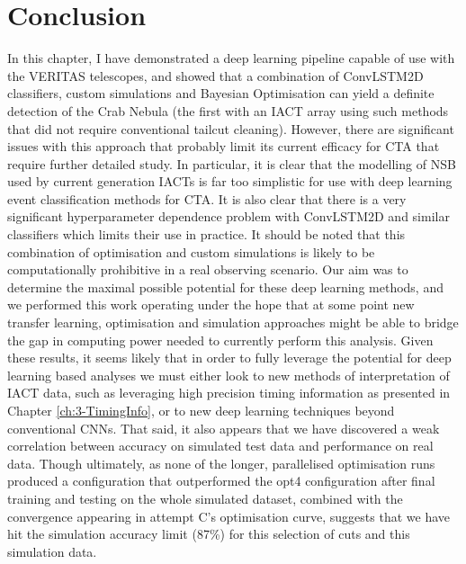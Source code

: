 \section{Conclusion}
In this chapter, I have demonstrated a deep learning pipeline capable of use with the VERITAS telescopes, and showed that a combination of ConvLSTM2D classifiers, custom simulations and Bayesian Optimisation can yield a definite detection of the Crab Nebula (the first with an IACT array using such methods that did not require conventional tailcut cleaning). However, there are significant issues with this approach that probably limit its current efficacy for CTA that require further detailed study. In particular, it is clear that the modelling of NSB used by current generation IACTs is far too simplistic for use with deep learning event classification methods for CTA. It is also clear that there is a very significant hyperparameter dependence problem with ConvLSTM2D and similar classifiers which limits their use in practice. It should be noted that this combination of optimisation and custom simulations is likely to be computationally prohibitive in a real observing scenario. Our aim was to determine the maximal possible potential for these deep learning methods, and we performed this work operating under the hope that at some point new transfer learning, optimisation and simulation approaches might be able to bridge the gap in computing power needed to currently perform this analysis. Given these results, it seems likely that in order to fully leverage the potential for deep learning based analyses we must either look to new methods of interpretation of IACT data, such as leveraging high precision timing information as presented in Chapter \ref{ch:3-TimingInfo}, or to new deep learning techniques beyond conventional CNNs. That said, it also appears that we have discovered a weak correlation between accuracy on simulated test data and performance on real data.
Though ultimately, as none of the longer, parallelised optimisation runs produced a configuration that outperformed the opt4 configuration after final training and testing on the whole simulated dataset, combined with the convergence appearing in attempt C's optimisation curve, suggests that we have hit the simulation accuracy limit (87\%) for this selection of cuts and this simulation data. 